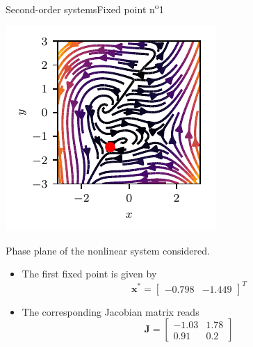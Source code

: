 \documentclass[usenames,dvipsnames,svgnames,10pt,aspectratio=169]{beamer}
\begin{document}
\begin{frame}[t, c]{Second-order systems}{Fixed point n\textsuperscript{o}1}
		\begin{minipage}{.48\textwidth}
			\centering
			\includegraphics[width=.75\textwidth]{fixed_points_1}

			{\small Phase plane of the nonlinear system considered.}
		\end{minipage}%
		\hfill
		\begin{minipage}{.48\textwidth}
			\begin{itemize}
				\item The first fixed point is given by
				$${\bm x}^* = \begin{bmatrix} -0.798 & -1.449 \end{bmatrix}^T$$

				\bigskip

				\item The corresponding Jacobian matrix reads
				$${\bm J} = \begin{bmatrix} -1.03 & 1.78 \\ 0.91 & 0.2 \end{bmatrix}$$
			\end{itemize}
		\end{minipage}

		\vspace{1cm}
\end{frame}
\end{document}
